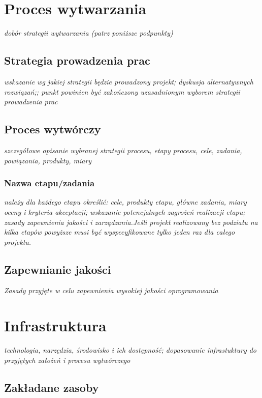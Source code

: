 \documentclass[11pt,oneside,a4paper,titlepage,onecolumn]{article}
\begin{document}
\section{Proces wytwarzania}

\emph{dobór strategii wytwarzania (patrz poniższe podpunkty)}

\subsection{Strategia prowadzenia prac}

\emph{wskazanie wg jakiej strategii będzie prowadzony projekt; dyskusja alternatywnych rozwiązań;; punkt powinien być zakończony uzasadnionym wyborem strategii prowadzenia prac}

\subsection{Proces wytwórczy}

\emph{szczegółowe opisanie wybranej strategii procesu, etapy procesu, cele, zadania, powiązania, produkty, miary}

\subsubsection{Nazwa etapu/zadania}

\emph{należy dla każdego etapu określić: cele, produkty etapu, główne zadania, miary oceny i kryteria akceptacji; wskazanie potencjalnych zagrożeń realizacji etapu; zasady zapewnienia jakości i zarządzania.Jeśli projekt realizowany bez podziału na kilka etapów powyższe musi być wyspecyfikowane tylko jeden raz dla całego projektu.}

\subsection{Zapewnianie jakości}

\emph{Zasady przyjęte w celu zapewnienia wysokiej jakości oprogramowania}

\section{Infrastruktura}

\emph{technologia, narzędzia, środowisko i ich dostępność; dopasowanie infrastuktury do przyjętych założeń i procesu wytwórczego}

\subsection{Zakładane zasoby}
\end{document}
